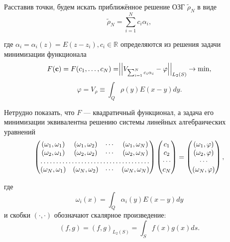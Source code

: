 \documentclass[a4paper]{article}
\newcommand{\V}[1]{\int_Q #1(y) E(x-y) dy}
\begin{document}
Расставив точки, будем искать приближённое решение ОЗГ $\tilde \rho_N$ в виде
\begin{equation}
  \tilde \rho_N=\sum_{i=1}^N c_i \alpha_i,
\end{equation}

где $\alpha_i=\alpha_i(z)=E(z-z_i),c_i \in \mathbb{R}$ определяются из решения задачи минимизации функционала
\begin{equation}
  F({\bf c})=F(c_1,\dots,c_N)=\Bigr|\Bigr|V_{\sum_{i=1}^N c_i \alpha_i} -\varphi\Bigr|\Bigr|_{L_2(S)} \rightarrow \min,
\end{equation}
\begin{equation*}
  \varphi =V_{\rho} \equiv \V{\rho}.
\end{equation*}

Нетрудно показать, что $F$ --- квадратичный функционал, а задача его минимизации эквивалентна решению системы линейных алгебраических уравнений
\begin{equation}
  \begin{pmatrix}
    (\omega_1, \omega_1) & (\omega_1, \omega_2) & \cdots & (\omega_1, \omega_N) \\
    (\omega_2, \omega_1) & (\omega_2, \omega_2) & \cdots & (\omega_2, \omega_N) \\
    \hdotsfor{4}                                                                \\
    (\omega_N, \omega_1) & (\omega_N, \omega_2) & \cdots & (\omega_N, \omega_N) \\
  \end{pmatrix}
  \begin{pmatrix}
    c_1    \\
    c_2    \\
    \cdots \\
    c_N    \\
  \end{pmatrix}
  =
  \begin{pmatrix}
    (\omega_1,\varphi) \\
    (\omega_2,\varphi) \\
    \cdots             \\
    (\omega_N,\varphi) \\
  \end{pmatrix},
  \label{gram}
\end{equation}

где
\begin{equation}
  \omega_i(x)=\V{\alpha_i}
\end{equation}
и скобки $(\cdot,\cdot)$ обозначают скалярное произведение:
\begin{equation}
  (f,g)=(f,g)_{L_2(S)}=\int_S f(x)g(x) ds.
\end{equation}
\end{document}
